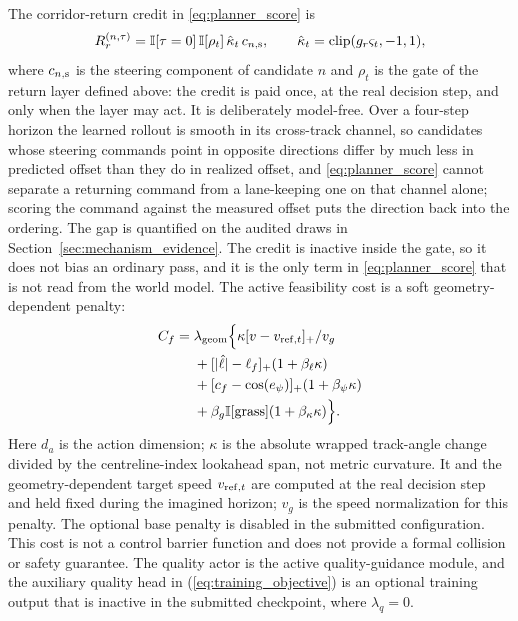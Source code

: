 \documentclass[journal]{IEEEtran}
\begin{document}
The corridor-return credit in \eqref{eq:planner_score} is
\begin{equation}
 R_r^{(n,\tau)}=\mathbb I[\tau=0]\,\mathbb I[\rho_t]\,\hat\kappa_t\,c_{n,\rm s},
 \qquad \hat\kappa_t=\operatorname{clip}(g_r\varsigma_t,-1,1),
 \label{eq:return_credit}
\end{equation}
where $c_{n,\rm s}$ is the steering component of candidate $n$ and $\rho_t$
is the gate of the return layer defined above: the credit is paid once, at the
real decision step, and only when the layer may act. It is deliberately
model-free. Over a four-step horizon the learned rollout is smooth in its
cross-track channel, so candidates whose steering commands point in opposite
directions differ by much less in predicted offset than they do in realized
offset, and \eqref{eq:planner_score} cannot separate a returning command from a
lane-keeping one on that channel alone; scoring the command against the measured
offset puts the direction back into the ordering. The gap is quantified on the
audited draws in Section~\ref{sec:mechanism_evidence}. The credit is inactive inside the
gate, so it does not bias an ordinary pass, and it is the only term in
\eqref{eq:planner_score} that is not read from the world model.
The active feasibility cost is a soft geometry-dependent penalty:
\begin{equation}
\begin{aligned}
 C_f={}&\lambda_{\rm geom}\Big\{
 \kappa[v-v_{{\rm ref},t}]_+/v_g\\
 &+[|\hat\ell|-\ell_f]_+(1+\beta_\ell\kappa)\\
 &+[c_f-\cos(e_\psi)]_+(1+\beta_\psi\kappa)\\
 &+\beta_g\mathbb I[\mathrm{grass}](1+\beta_\kappa\kappa)\Big\}.
\end{aligned}
\label{eq:feasibility_cost}
\end{equation}
Here $d_a$ is the action dimension; $\kappa$ is the absolute wrapped track-angle
change divided by the centreline-index lookahead span, not metric curvature.
It and the geometry-dependent target speed $v_{{\rm ref},t}$ are computed
at the real decision step and held fixed during the imagined horizon;
$v_g$ is the speed normalization for this penalty. The optional base penalty
is disabled in the submitted configuration. This cost is not a control barrier function and does not provide a formal collision
or safety guarantee. The quality actor is the active quality-guidance module,
and the auxiliary quality head in (\ref{eq:training_objective}) is an optional
training output that is inactive in the submitted checkpoint, where
$\lambda_q=0$.
\end{document}
